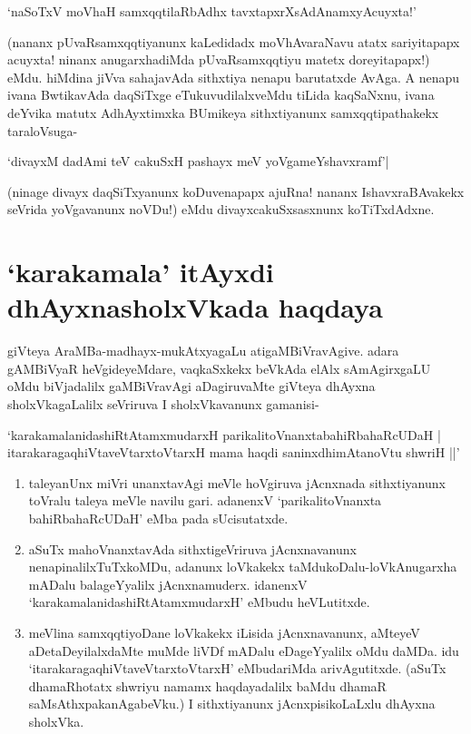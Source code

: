 \begin{shloka}
`naSoTxV moVhaH samxqqtilaRbAdhx tavxtapxrXsAdAnamxyA\s cuyxta!'\label{91}
\end{shloka}

(nananx pUvaRsamxqqtiyanunx kaLedidadx moVhAvaraNavu atatx sariyitapapx acuyxta! ninanx anugarxhadiMda pUvaRsamxqqtiyu matetx doreyitapapx!) eMdu. hiMdina jiVva sahajavAda sithxtiya nenapu barutatxde AvAga. A nenapu ivana BwtikavAda daqSiTxge eTukuvudilalxveMdu tiLida kaqSaNxnu, ivana deYvika matutx AdhAyxtimxka BUmikeya sithxtiyanunx samxqqtipathakekx taraloVsuga-

\begin{shloka}
`divayxM dadAmi teV cakuSxH pashayx meV yoVgameYshavxramf'|\label{91b}
\end{shloka}

(ninage divayx daqSiTxyanunx koDuvenapapx ajuRna! nananx IshavxraBAvakekx seVrida yoVgavanunx noVDu!) eMdu divayxcakuSxsasxnunx koTiTxdAdxne.

\section*{`karakamala' itAyxdi dhAyxnasholxVkada haqdaya}

giVteya AraMBa-madhayx-mukAtxyagaLu atigaMBiVravAgive. adara gAMBiVyaR heVgideyeMdare, vaqkaSxkekx beVkAda elAlx sAmAgirxgaLU oMdu biVjadalilx gaMBiVravAgi aDagiruvaMte giVteya dhAyxna sholxVkagaLalilx seVriruva I sholxVkavanunx gamanisi-

\begin{shloka}
`karakamalanidashiRtAtamxmudarxH parikalitoVnanxtabahiRbahaRcUDaH |\label{92}\\
itarakaragaqhiVtaveVtarxtoVtarxH mama haqdi saninxdhimAtanoVtu shwriH ||'
\end{shloka}

\begin{enumerate}
\item taleyanUnx miVri unanxtavAgi meVle hoVgiruva jAcnxnada sithxtiyanunx toVralu taleya meVle navilu gari. adanenxV `parikalitoVnanxta bahiRbahaRcUDaH' eMba pada sUcisutatxde.
\item aSuTx mahoVnanxtavAda sithxtigeVriruva jAcnxnavanunx nenapinalilxTuTxkoMDu, adanunx loVkakekx taMdukoDalu-loVkAnugarxha mADalu balageYyalilx jAcnxnamuderx. idanenxV `karakamalanidashiRtAtamxmudarxH' eMbudu heVLutitxde.
\item meVlina samxqqtiyoDane loVkakekx iLisida jAcnxnavanunx, aMteyeV aDetaDeyilalxdaMte muMde liVDf mADalu eDageYyalilx oMdu daMDa. idu `itarakaragaqhiVtaveVtarxtoVtarxH' eMbudariMda arivAgutitxde. (aSuTx dhamaRhotatx shwriyu namamx haqdayadalilx baMdu dhamaR saMsAthxpakanAgabeVku.) I sithxtiyanunx jAcnxpisikoLaLxlu dhAyxna sholxVka.
\end{enumerate}

